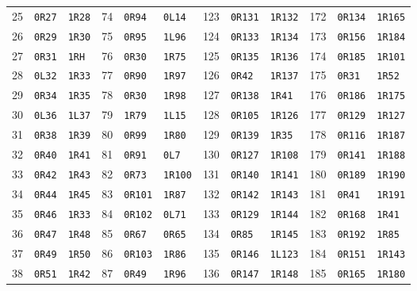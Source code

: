 \begin{center}
\begin{tabular}{rll@{\qquad}rll@{\qquad}rll@{\qquad}rll}
25 & \texttt{0R27} & \texttt{1R28} & 74 & \texttt{0R94} & \texttt{0L14} & 123 & \texttt{0R131} & \texttt{1R132} & 172 & \texttt{0R134} & \texttt{1R165}\\
26 & \texttt{0R29} & \texttt{1R30} & 75 & \texttt{0R95} & \texttt{1L96} & 124 & \texttt{0R133} & \texttt{1R134} & 173 & \texttt{0R156} & \texttt{1R184}\\
27 & \texttt{0R31} & \texttt{1RH} & 76 & \texttt{0R30} & \texttt{1R75} & 125 & \texttt{0R135} & \texttt{1R136} & 174 & \texttt{0R185} & \texttt{1R101}\\
28 & \texttt{0L32} & \texttt{1R33} & 77 & \texttt{0R90} & \texttt{1R97} & 126 & \texttt{0R42} & \texttt{1R137} & 175 & \texttt{0R31} & \texttt{1R52}\\
29 & \texttt{0R34} & \texttt{1R35} & 78 & \texttt{0R30} & \texttt{1R98} & 127 & \texttt{0R138} & \texttt{1R41} & 176 & \texttt{0R186} & \texttt{1R175}\\
30 & \texttt{0L36} & \texttt{1L37} & 79 & \texttt{1R79} & \texttt{1L15} & 128 & \texttt{0R105} & \texttt{1R126} & 177 & \texttt{0R129} & \texttt{1R127}\\
31 & \texttt{0R38} & \texttt{1R39} & 80 & \texttt{0R99} & \texttt{1R80} & 129 & \texttt{0R139} & \texttt{1R35} & 178 & \texttt{0R116} & \texttt{1R187}\\
32 & \texttt{0R40} & \texttt{1R41} & 81 & \texttt{0R91} & \texttt{0L7} & 130 & \texttt{0R127} & \texttt{1R108} & 179 & \texttt{0R141} & \texttt{1R188}\\
33 & \texttt{0R42} & \texttt{1R43} & 82 & \texttt{0R73} & \texttt{1R100} & 131 & \texttt{0R140} & \texttt{1R141} & 180 & \texttt{0R189} & \texttt{1R190}\\
34 & \texttt{0R44} & \texttt{1R45} & 83 & \texttt{0R101} & \texttt{1R87} & 132 & \texttt{0R142} & \texttt{1R143} & 181 & \texttt{0R41} & \texttt{1R191}\\
35 & \texttt{0R46} & \texttt{1R33} & 84 & \texttt{0R102} & \texttt{0L71} & 133 & \texttt{0R129} & \texttt{1R144} & 182 & \texttt{0R168} & \texttt{1R41}\\
36 & \texttt{0R47} & \texttt{1R48} & 85 & \texttt{0R67} & \texttt{0R65} & 134 & \texttt{0R85} & \texttt{1R145} & 183 & \texttt{0R192} & \texttt{1R85}\\
37 & \texttt{0R49} & \texttt{1R50} & 86 & \texttt{0R103} & \texttt{1R86} & 135 & \texttt{0R146} & \texttt{1L123} & 184 & \texttt{0R151} & \texttt{1R143}\\
38 & \texttt{0R51} & \texttt{1R42} & 87 & \texttt{0R49} & \texttt{1R96} & 136 & \texttt{0R147} & \texttt{1R148} & 185 & \texttt{0R165} & \texttt{1R180}\\

\end{tabular}
\end{center}
